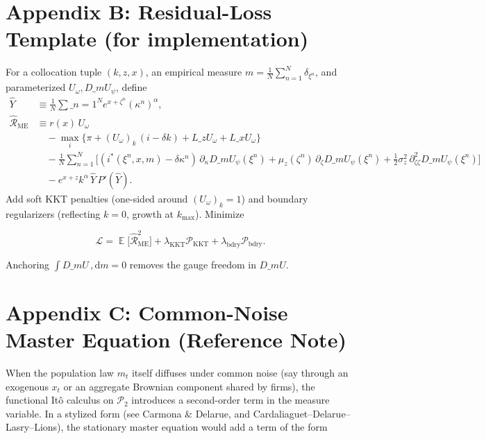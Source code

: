 \documentclass[11pt,letterpaper,oneside]{article}
\numberwithin{equation}{section}
\DeclareMathOperator{\E}{\mathbb{E}}
\newcommand{\1}{\mathbf{1}}
\newcommand{\diff}{,\mathrm{d}}
\newcommand{\Lz}{L\_z}
\newcommand{\Lx}{L\_x}
\newcommand{\dmU}{D\_m U}
\begin{document}
\section{Appendix B: Residual-Loss Template (for implementation)}\label{app:loss}

For a collocation tuple $(k,z,x)$, an empirical measure $m=\tfrac1N\sum_{n=1}^N \delta_{\xi^n}$, and parameterized $U_\omega,\dmU_\psi$, define
\begin{align*}
\widehat{Y} &\equiv \frac{1}{N}\sum\_{n=1}^N e^{x+\zeta^n}(\kappa^n)^\alpha,\\
\widehat{\mathcal{R}}_{\mathrm{ME}} &\equiv r(x)\,U_\omega\\
  &\quad - \max_{i}\Big\{ \pi + (U_{\omega})_k\,(i-\delta k) + \Lz U_{\omega} + \Lx U_{\omega} \Big\} \\
  &\quad - \frac{1}{N}\sum_{n=1}^N \Big[ (i^*(\xi^n,x,m)-\delta\kappa^n)\,\partial_{\kappa}\dmU_{\psi}(\xi^n)
    + \mu_z(\zeta^n)\,\partial_{\zeta}\dmU_{\psi}(\xi^n)
    + \tfrac12 \sigma_z^2\,\partial^2_{\zeta\zeta}\dmU_{\psi}(\xi^n) \Big] \\
  &\quad - e^{x+z}k^{\alpha}\,\widehat{Y}\,P'(\widehat{Y}).
  \end{align*}
  Add soft KKT penalties (one-sided around $(U_\omega)_k=1$) and boundary regularizers (reflecting $k=0$, growth at $k_{\max}$). Minimize

$$
\mathcal{L}=\E\big[\widehat{\mathcal{R}}_{\mathrm{ME}}^2\big]+\lambda_{\mathrm{KKT}}\mathcal{P}_{\mathrm{KKT}}
+\lambda_{\mathrm{bdry}}\mathcal{P}_{\mathrm{bdry}}.
$$

Anchoring $\int \dmU\,\diff m=0$ removes the gauge freedom in $\dmU$.

\section{Appendix C: Common-Noise Master Equation (Reference Note)}\label{app:common-noise}

When the population law $m_t$ itself diffuses under common noise (say through an exogenous $x_t$ or an aggregate Brownian component shared by firms), the functional Itô calculus on $\mathcal P_2$ introduces a second-order term in the measure variable. In a stylized form (see Carmona \& Delarue, and Cardaliaguet--Delarue--Lasry--Lions), the stationary master equation would add a term of the form
\end{document}
